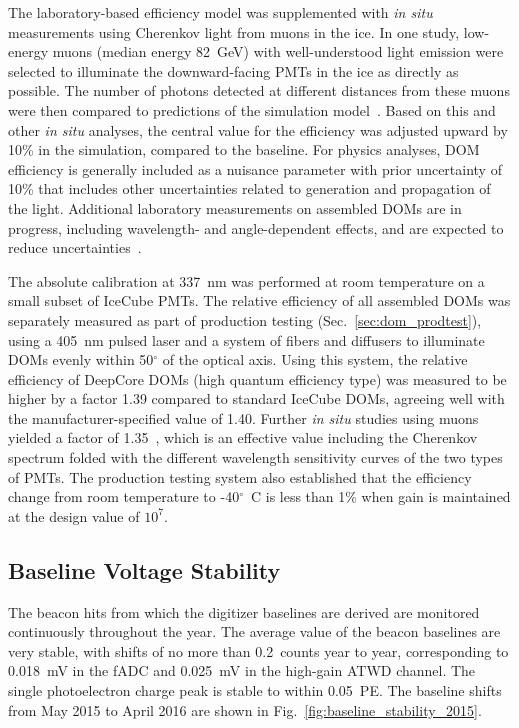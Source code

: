 The laboratory-based efficiency model was supplemented with \textit{in
  situ} measurements using Cherenkov light from muons in the ice.  In one
study, low-energy muons (median energy 82~GeV) with well-understood light
emission were selected to illuminate the downward-facing PMTs in the ice as
directly as possible. The number of photons detected at different
distances from these muons were then compared to predictions of the
simulation model~\cite{IC3:ereco}.  Based on this and other \textit{in
  situ} analyses, the central value for the efficiency was adjusted upward
by 10\% in the simulation, compared to the baseline.  For physics analyses,
DOM efficiency is generally included as a nuisance parameter with prior
uncertainty of 10\% that includes other uncertainties related to
generation and propagation of the light. Additional laboratory measurements
on assembled DOMs are in progress, including wavelength- and angle-dependent
effects, and are expected to reduce uncertainties~\cite{ICECUBE:DOMEFF}.

The absolute calibration at 337~nm was performed at room temperature on a
small subset of IceCube PMTs. The relative efficiency of all assembled DOMs
was separately measured as part of production testing
(Sec.~\ref{sec:dom_prodtest}), using a 405~nm pulsed laser and a system of
fibers and diffusers to illuminate DOMs evenly within 50$^{\circ}$ of the
optical axis.  Using this system, the relative efficiency of DeepCore DOMs
(high quantum efficiency type) was measured to be higher by a factor 1.39
compared to standard IceCube DOMs, agreeing well with the
manufacturer-specified value of 1.40. Further \textit{in situ} studies
using muons yielded a factor of 1.35~\cite{ICECUBE:DC}, which is an
effective value including the Cherenkov spectrum folded with the different
wavelength sensitivity curves of the two types of PMTs.  The production
testing system also established that the efficiency change from room
temperature to -40$^{\circ}$~C is less than 1\% when gain is maintained at
the design value of $10^7$.

\subsection{\label{sec:baselines}Baseline Voltage Stability}

The beacon hits from which the digitizer baselines are derived are
monitored continuously throughout the year. The average value of the
beacon baselines are very stable, with shifts of no more than
0.2~counts year to year, corresponding to 0.018~mV in the fADC and
0.025~mV in the high-gain ATWD channel. The single photoelectron
charge peak is stable to within 0.05~PE. The baseline shifts from May
2015 to April 2016 are shown in Fig.~\ref{fig:baseline_stability_2015}. 

